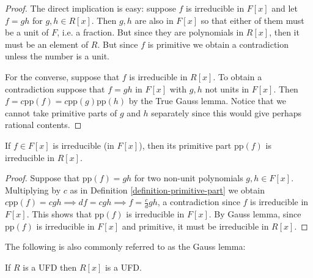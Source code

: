 \begin{proof}
The direct implication is easy: suppose $f$
is irreducible in $F[x]$ and let
$f=gh$ for $g,h\in R[x]$. Then $g,h$ are also
in $F[x]$ so that either of them
must be a unit of $F$, i.e. a fraction. But
since they are polynomials in
$R[x]$, then it must be an element of $R$.
But since $f$ is primitive we obtain
a contradiction unless the number is a unit.

For the converse, suppose that $f$ is
irreducible in $R[x]$. To obtain a
contradiction suppose that $f=gh$ in $F[x]$
with $g,h$ not units in $F[x]$.
Then
$f=c\text{pp}(f)=c\text{pp}(g)\text{pp}(h)$
by the True Gauss lemma.
Notice that we cannot take primitive parts of
$g$ and $h$ separately since this
would give perhaps rational contents.
\end{proof}

\begin{lemma}
\label{lemma-irred-fx-impli-primi-part}
If $f\in F[x]$ is irreducible (in $F[x]$),
then its primitive part
$\text{pp}(f)$ is irreducible in $R[x]$.
\end{lemma}

\begin{proof}
Suppose that $\text{pp}(f)=gh$ for two
non-unit polynomials $g,h\in F[x]$.
Multiplying by $c$ as in Definition
\ref{definition-primitive-part} we obtain
$c\text{pp}(f)=cgh \implies df=cgh \implies
f=\frac{c}{d}gh$, a contradiction
since $f$ is irreducible in $F[x]$. This
shows that
$\text{pp}(f)$ is irreducible in $F[x]$. By
Gauss lemma, since $\text{pp}(f)$ is
irreducible in $F[x]$ and primitive, it must
be irreducible in $R[x]$.
\end{proof}

\noindent
The following is also commonly referred to as
the Gauss lemma:

\begin{lemma}
\label{lemma-gauss}
If $R$ is a UFD then $R[x]$ is a UFD.
\end{lemma}

